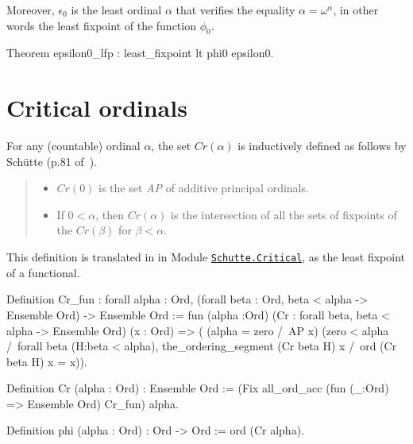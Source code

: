 {Moreover,  $\epsilon_0$ is the least ordinal $\alpha$ that verifies the equality 
$\alpha = \omega^\alpha$, in other words the least fixpoint of the function  $\phi_0$.

\begin{Coqsrc}
Theorem epsilon0_lfp : least_fixpoint lt phi0 epsilon0.
\end{Coqsrc}


\section{Critical ordinals}


For any  (countable) ordinal $\alpha$, the set $\textit{Cr}(\alpha)$ is inductively defined 
as follows by Schütte (p.81 of~\cite{schutte}).

\begin{quote}
  \begin{itemize}
  \item $\textit{Cr}(0)$ is the set \textit{AP} of additive principal ordinals.
  \item If $0<\alpha$, then $\textit{Cr}(\alpha)$ is the intersection of all the sets of fixpoints of the $\textit{Cr}(\beta)$ for $\beta<\alpha$.
  \end{itemize}
\end{quote}

This definition is translated in \coq{} in 
Module \href{../theories/html/hydras.Schutte.Critical.html}%
{\texttt{Schutte.Critical}}, as the least fixpoint of a functional. 


\begin{Coqsrc}
Definition Cr_fun : forall alpha : Ord,
       (forall beta : Ord, beta < alpha -> Ensemble Ord) ->
        Ensemble Ord 
:= 
   fun (alpha :Ord)
        (Cr : forall beta, 
                beta < alpha -> Ensemble Ord) 
        (x : Ord) => (
       (alpha = zero /\ AP x) \/
       (zero < alpha /\
        forall beta (H:beta < alpha),
          the_ordering_segment (Cr beta H) x /\ ord (Cr  beta H) x = x)).

Definition Cr (alpha : Ord) : Ensemble Ord := 
    (Fix  all_ord_acc (fun (_:Ord) => Ensemble Ord) Cr_fun) alpha.
\end{Coqsrc}

\label{sect:phi-schutte}

\begin{Coqsrc}
Definition phi (alpha : Ord) : Ord -> Ord 
    :=  ord (Cr alpha).


\end{Coqsrc}}
